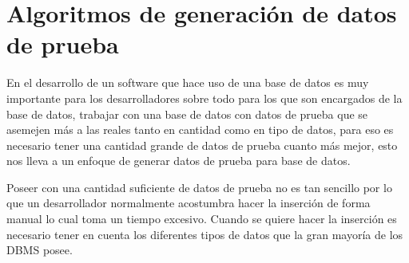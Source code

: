 \chapter{Algoritmos de generaci\'on de datos de prueba}
En el desarrollo de un software que hace uso de una base de datos es muy importante para los desarrolladores sobre todo para los que son encargados de la base de datos, trabajar con una base de datos con datos de prueba  que se asemejen m\'as a las reales tanto en cantidad como en tipo de datos, para eso es necesario tener una cantidad grande de datos de prueba cuanto m\'as mejor, esto nos lleva a un enfoque de generar datos de prueba para base de datos.

Poseer con una cantidad suficiente de datos de prueba no es tan sencillo por lo que un desarrollador normalmente acostumbra hacer la inserci\'on de forma manual lo cual toma un  tiempo excesivo. Cuando se quiere hacer la inserci\'on es necesario tener en cuenta los diferentes tipos de datos que la gran mayor\'ia de los DBMS posee.
